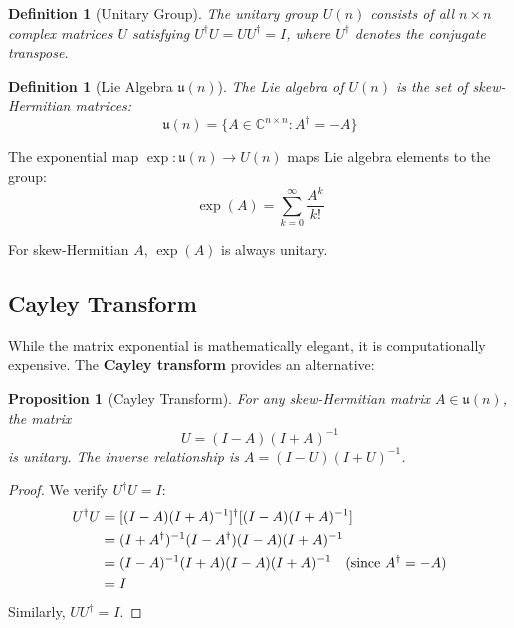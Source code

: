 \documentclass[11pt,a4paper]{article}
\newtheorem{proposition}[theorem]{Proposition}
\newtheorem{definition}[theorem]{Definition}
\newcommand{\C}{\mathbb{C}}
\begin{document}
\begin{definition}[Unitary Group]
The unitary group $U(n)$ consists of all $n \times n$ complex matrices $U$ satisfying $U^\dagger U = U U^\dagger = I$, where $U^\dagger$ denotes the conjugate transpose.
\end{definition}

\begin{definition}[Lie Algebra $\mathfrak{u}(n)$]
The Lie algebra of $U(n)$ is the set of skew-Hermitian matrices:
\begin{equation}
\mathfrak{u}(n) = \{A \in \C^{n \times n} : A^\dagger = -A\}
\end{equation}
\end{definition}

The exponential map $\exp: \mathfrak{u}(n) \to U(n)$ maps Lie algebra elements to the group:
\begin{equation}
\exp(A) = \sum_{k=0}^\infty \frac{A^k}{k!}
\end{equation}

For skew-Hermitian $A$, $\exp(A)$ is always unitary.

\subsection{Cayley Transform}

While the matrix exponential is mathematically elegant, it is computationally expensive. The \textbf{Cayley transform} provides an alternative:

\begin{proposition}[Cayley Transform]
\label{prop:cayley}
For any skew-Hermitian matrix $A \in \mathfrak{u}(n)$, the matrix
\begin{equation}
U = (I - A)(I + A)^{-1}
\end{equation}
is unitary. The inverse relationship is $A = (I - U)(I + U)^{-1}$.
\end{proposition}

\begin{proof}
We verify $U^\dagger U = I$:
\begin{align}
U^\dagger U &= [(I - A)(I + A)^{-1}]^\dagger [(I - A)(I + A)^{-1}] \notag \\
&= (I + A^\dagger)^{-1}(I - A^\dagger)(I - A)(I + A)^{-1} \notag \\
&= (I - A)^{-1}(I + A)(I - A)(I + A)^{-1} \quad (\text{since } A^\dagger = -A) \notag \\
&= I
\end{align}
Similarly, $U U^\dagger = I$.
\end{proof}
\end{document}
